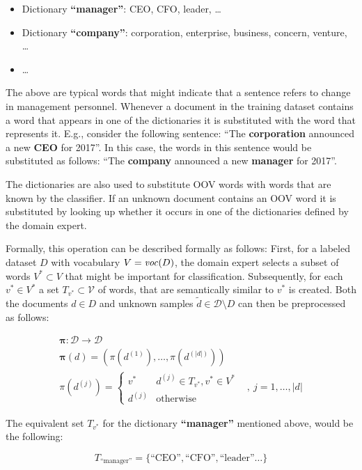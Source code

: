 \begin{itemize}
  \item Dictionary \textbf{``manager''}: CEO, CFO, leader, \ldots
  \item Dictionary \textbf{``company''}: corporation, enterprise, business,
  concern, venture,  \ldots
  \item \ldots
\end{itemize} 

The above are typical words that might indicate that a sentence refers to  
change in management personnel. Whenever a document in the training
dataset contains a word that appears in one of the dictionaries it is
substituted with the word that represents it. E.g., consider the following
sentence: ``The \textbf{corporation} announced a new \textbf{CEO} for 2017''. In this case, the
words in this sentence would be substituted as follows: ``The \textbf{company}
announced a new \textbf{manager} for 2017''. 

The dictionaries are also used to substitute OOV words with words that are
known by the classifier. If an unknown document contains an OOV word it is
substituted by looking up whether it occurs in one of the dictionaries defined
by the domain expert.
 
Formally, this operation can be described formally as follows: First,
for a labeled dataset $D$ with vocabulary $V=\mathit{voc}(D)$, the domain expert 
selects a subset of words $V^* \subset V$ that might be important for
classification.
Subsequently, for each $v^* \in V^*$ a set $T_{v^*} \subset \mathcal{V}$ of 
words, that are semantically similar to $v^*$ is created.  Both the
documents $d \in D$ and unknown samples $\tilde{d} \in \mathcal{D} \setminus D$
can then be preprocessed as follows:

\begin{eqnarray*}
\boldsymbol\pi: \mathcal{D} \to \mathcal{D} \\
\boldsymbol\pi(d) =
(\pi(d^{(1)}),\ldots,\pi(d^{(|d|)})) \\
\pi(d^{(j)}) = \begin{cases} 
v^* & d^{(j)} \in T_{v^*}, v^* \in V^* \\
d^{(j)} & \mathrm{otherwise} \end{cases}& ,~j=1,\ldots,|d|
\end{eqnarray*}


The equivalent set $T_{v^*}$ for the dictionary \textbf{``manager''} mentioned
above, would be the following:

\begin{equation*}
T_{\text{``manager''}} = \{\text{``CEO''}, \text{``CFO''},  \text{``leader''}
\ldots\}
\end{equation*}

